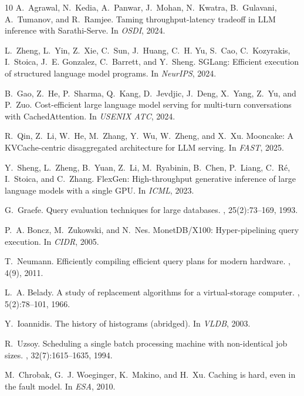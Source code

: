 \documentclass[10pt,twocolumn]{article}
\begin{document}
\begin{thebibliography}{10}
A.~Agrawal, N.~Kedia, A.~Panwar, J.~Mohan, N.~Kwatra, B.~Gulavani, A.~Tumanov, and R.~Ramjee.
\newblock Taming throughput-latency tradeoff in LLM inference with Sarathi-Serve.
\newblock In {\em OSDI}, 2024.

L.~Zheng, L.~Yin, Z.~Xie, C.~Sun, J.~Huang, C.~H. Yu, S.~Cao, C.~Kozyrakis, I.~Stoica, J.~E. Gonzalez, C.~Barrett, and Y.~Sheng.
\newblock SGLang: Efficient execution of structured language model programs.
\newblock In {\em NeurIPS}, 2024.

B.~Gao, Z.~He, P.~Sharma, Q.~Kang, D.~Jevdjic, J.~Deng, X.~Yang, Z.~Yu, and P.~Zuo.
\newblock Cost-efficient large language model serving for multi-turn conversations with CachedAttention.
\newblock In {\em USENIX ATC}, 2024.

R.~Qin, Z.~Li, W.~He, M.~Zhang, Y.~Wu, W.~Zheng, and X.~Xu.
\newblock Mooncake: A KVCache-centric disaggregated architecture for LLM serving.
\newblock In {\em FAST}, 2025.

Y.~Sheng, L.~Zheng, B.~Yuan, Z.~Li, M.~Ryabinin, B.~Chen, P.~Liang, C.~R\'e, I.~Stoica, and C.~Zhang.
\newblock FlexGen: High-throughput generative inference of large language models with a single GPU.
\newblock In {\em ICML}, 2023.

G.~Graefe.
\newblock Query evaluation techniques for large databases.
, 25(2):73--169, 1993.

P.~A. Boncz, M.~Zukowski, and N.~Nes.
\newblock MonetDB/X100: Hyper-pipelining query execution.
\newblock In {\em CIDR}, 2005.

T.~Neumann.
\newblock Efficiently compiling efficient query plans for modern hardware.
, 4(9), 2011.

L.~A. Belady.
\newblock A study of replacement algorithms for a virtual-storage computer.
, 5(2):78--101, 1966.

Y.~Ioannidis.
\newblock The history of histograms (abridged).
\newblock In {\em VLDB}, 2003.

R.~Uzsoy.
\newblock Scheduling a single batch processing machine with non-identical job sizes.
, 32(7):1615--1635, 1994.

M.~Chrobak, G.~J. Woeginger, K.~Makino, and H.~Xu.
\newblock Caching is hard, even in the fault model.
\newblock In {\em ESA}, 2010.

\end{thebibliography}
\end{document}
